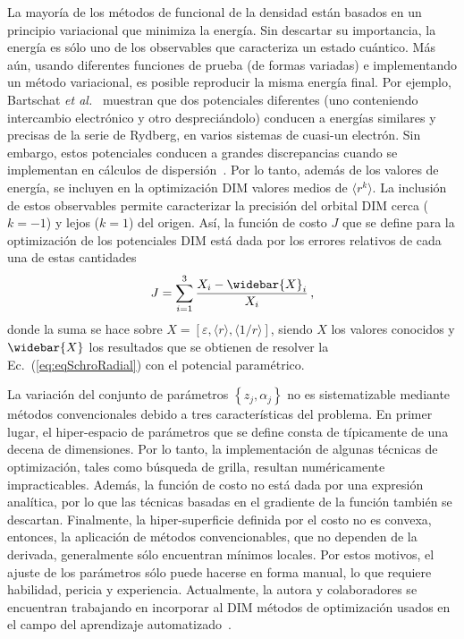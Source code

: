 La mayoría de los métodos de funcional de la densidad están basados en 
un principio variacional que minimiza la energía. Sin 
descartar su importancia, la energía es sólo uno de los observables que 
caracteriza un estado cuántico. Más aún, usando diferentes funciones de 
prueba (de formas variadas) e implementando un método variacional, es 
posible reproducir la misma energía final. Por ejemplo, Bartschat 
\textit{et al.}~\cite{Albright:93,Bartschat:96} muestran que dos 
potenciales diferentes (uno conteniendo intercambio electrónico y otro 
despreciándolo) conducen a energías similares y precisas de la serie de 
Rydberg, en varios sistemas de cuasi-un electrón. Sin embargo, estos 
potenciales conducen a grandes discrepancias cuando se implementan en 
cálculos de dispersión~\cite{BartschatBray:96}. Por lo tanto, además de 
los valores de energía, se incluyen en la optimización DIM valores 
medios de $\langle r^k \rangle$. La inclusión de estos 
observables permite caracterizar la precisión del orbital DIM cerca 
($k=-1$) y lejos ($k=1$) del origen. Así, la función de costo $J$ que se 
define para la optimización de los potenciales DIM está dada por los 
errores relativos de cada una de estas cantidades
\begin{equation}
J=\sum_{i=1}^3 \frac{X_i-\widebar{X}_i}{X_i}\,,
\label{eq:fncosto-dim}
\end{equation}
donde la suma se hace sobre 
$X=\left[\varepsilon,\langle r \rangle,\langle 1/r \rangle\right]$, 
siendo $X$ los valores conocidos y $\widebar{X}$ los resultados que se 
obtienen de resolver la Ec.~(\ref{eq:eqSchroRadial}) con el potencial 
paramétrico. 

La variación del conjunto de parámetros $\left\{z_j,\alpha_j\right\}$ no 
es sistematizable mediante métodos convencionales debido a tres 
características del problema. En primer lugar, el hiper-espacio de 
parámetros que se define consta de típicamente de una decena de 
dimensiones. Por lo tanto, la implementación de algunas técnicas de 
optimización, tales como búsqueda de grilla, resultan numéricamente 
impracticables. Además, la función de costo no está dada por una 
expresión analítica, por lo que las técnicas basadas en el gradiente de 
la función también se descartan. Finalmente, la hiper-superficie 
definida por el costo no es convexa, entonces, la aplicación de métodos 
convencionables, que no dependen de la derivada, generalmente sólo 
encuentran mínimos locales. Por estos motivos, el ajuste de los 
parámetros sólo puede hacerse en forma manual, lo que  
requiere habilidad, pericia y experiencia. Actualmente, la autora y 
colaboradores se encuentran trabajando en incorporar al DIM métodos de 
optimización usados en el campo del aprendizaje 
automatizado~\cite{DiFilippo:19}.

